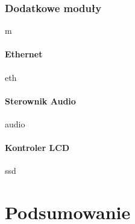 \documentclass[a4paper,12pt]{book}
\begin{document}
			\subsection{Dodatkowe moduły}
				\label{sec:linux_modules}
				m
				\subsubsection{Ethernet}
					eth
				\subsubsection{Sterownik Audio}
					audio
				\subsubsection{Kontroler LCD}
					ssd
		
	\chapter{Podsumowanie}

	
	
	
	
	
	\appendix
	
\end{document}
